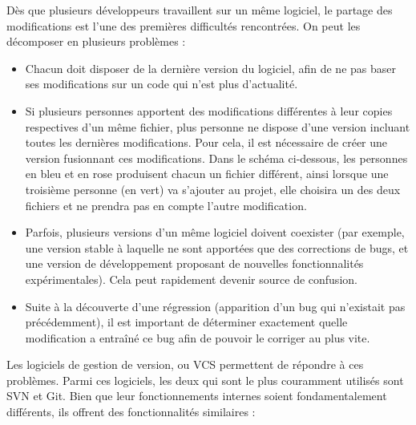Dès que plusieurs développeurs travaillent sur un même logiciel, le partage des modifications est l'une des premières difficultés rencontrées. On peut les décomposer en plusieurs problèmes :

\begin{itemize}
\item Chacun doit disposer de la dernière version du logiciel, afin de ne pas baser ses modifications sur un code qui n’est plus d’actualité.
\item Si plusieurs personnes apportent des modifications différentes à leur copies respectives d’un même fichier, plus personne ne dispose d’une version incluant toutes les dernières modifications. Pour cela, il est nécessaire de créer une version fusionnant ces modifications. Dans le schéma ci-dessous, les personnes en bleu et en rose produisent chacun un fichier différent, ainsi lorsque une troisième personne (en vert) va s'ajouter au projet, elle choisira un des deux fichiers et ne prendra pas en compte l'autre modification.
\item Parfois, plusieurs versions d’un même logiciel doivent coexister (par exemple, une version stable à laquelle ne sont apportées que des corrections de bugs, et une version de développement proposant de nouvelles fonctionnalités expérimentales). Cela peut rapidement devenir source de confusion.
\item Suite à la découverte d’une régression (apparition d’un bug qui n’existait pas précédemment), il est important de déterminer exactement quelle modification a entraîné ce bug afin de pouvoir le corriger au plus vite.
\end{itemize}


Les logiciels de gestion de version, ou \gls{VCS} permettent de répondre à ces problèmes. Parmi ces logiciels, les deux qui sont le plus couramment utilisés sont SVN et Git. Bien que leur fonctionnements internes soient fondamentalement différents, ils offrent des fonctionnalités similaires :


